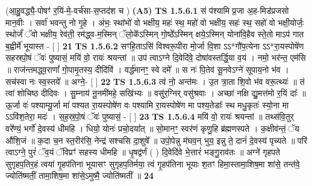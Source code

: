 \documentclass[17pt]{extarticle}
\begin{document}
                  \newline
                      (आ॒हु॒वद्ध्यै॒-पोषꣳ॑ र॒यिं-मे॒-वर्च॑सा-स॒प्तद॑श च )  \textbf{(A5)} \newline \newline
                                        \textbf{ TS 1.5.6.1} \newline
                  सं प॑श्यामि प्र॒जा अ॒ह-मिड॑प्रजसो मान॒वीः । सर्वा॑ भवन्तु नो गृ॒हे । अंभः॒ स्थांभो॑ वो भक्षीय॒ महः॑ स्थ॒ महो॑ वो भक्षीय॒ सहः॑ स्थ॒ सहो॑ वो भक्षी॒योर्जः॒ स्थोर्जं॑ ॅवो भक्षीय॒ रेव॑ती॒ रम॑द्ध्व-म॒स्मिन् ॅलो॒के᳚ऽस्मिन् गो॒ष्ठे᳚ऽस्मिन् क्षये॒ऽस्मिन् योना॑वि॒हैव स्ते॒तो माऽप॑ गात ब॒ह्वीर्मे॑ भूयास्त - [ ] \textbf{  21} \newline
                  \newline
                                \textbf{ TS 1.5.6.2} \newline
                  सꣳहि॒ताऽसि॑ विश्वरू॒पीरा मो॒र्जा वि॒शा ऽऽ*गौ॑प॒त्येना ऽऽ*रा॒यस्पोषे॑ण सहस्रपो॒षं ॅवः॑ पुष्यासं॒ मयि॑ वो॒ रायः॑ श्रयन्तां ॥ उप॑ त्वाऽग्ने दि॒वेदि॑वे॒ दोषा॑वस्तर्द्धि॒या व॒यं । नमो॒ भर॑न्त॒ एम॑सि ॥ राज॑न्तमद्ध्व॒राणां᳚ गो॒पामृ॒तस्य॒ दीदि॑विं । वर्द्ध॑मानꣳ॒॒ स्वे दमे᳚ ॥ स नः॑ पि॒तेव॑ सू॒नवेऽग्ने॑ सूपाय॒नो भ॑व । सच॑स्वा नः स्व॒स्तये᳚ ॥ अग्ने॒- [ ] \textbf{  22} \newline
                  \newline
                                \textbf{ TS 1.5.6.3} \newline
                  त्वं नो॒ अन्त॑मः । उ॒त त्रा॒ता शि॒वो भ॑व वरू॒त्थ्यः॑ ॥ तं त्वा॑ शोचिष्ठ दीदिवः । सु॒म्नाय॑ नू॒नमी॑महे॒ सखि॑भ्यः ॥ वसु॑र॒ग्निर् वसु॑श्रवाः । अच्छा॑ नक्षि द्यु॒मत्त॑मो र॒यिं दाः᳚ ॥ ऊ॒र्जा वः॑ पश्याम्यू॒र्जा मा॑ पश्यत रा॒यस्पोषे॑ण वः पश्यामि रा॒यस्पोषे॑ण मा पश्य॒तेडाः᳚ स्थ मधु॒कृतः॑ स्यो॒ना मा ऽऽवि॑श॒तेरा॒ मदः॑ । स॒ह॒स्र॒पो॒षं ॅवः॑ पुष्यासं॒ - [ ] \textbf{  23} \newline
                  \newline
                                \textbf{ TS 1.5.6.4} \newline
                  मयि॑ वो॒ रायः॑ श्रयन्तां ॥ तथ्स॑वि॒तुर् वरे᳚ण्यं॒ भर्गो॑ दे॒वस्य॑ धीमहि । धियो॒ योनः॑ प्रचो॒दया᳚त् ॥ सो॒मानꣳ॒॒ स्वर॑णं कृणु॒हि ब्र॑ह्मणस्पते । क॒क्षीव॑न्तं॒ ॅय औ॑शि॒जं ॥ क॒दा च॒न स्त॒रीर॑सि॒ नेन्द्र॑ सश्चसि दा॒शुषे᳚ ॥ उपो॒पेन्नु म॑घव॒न् भुय॒ इन्नु ते॒ दानं॑ दे॒वस्य॑ पृच्यते ॥ परि॑ त्वाऽग्ने॒ पुरं॑ ॅव॒यं ॅविप्रꣳ॑ सहस्य धीमहि ॥ धृ॒षद्व॑र्णं ( ) दि॒वेदि॑वे भे॒त्तारं॑ भङ्गु॒राव॑तः ॥ अग्ने॑ गृहपते सुगृहप॒तिर॒हं त्वया॑ गृ॒हप॑तिना भूयासꣳ सुगृहप॒तिर्मया॒ त्वं गृ॒हप॑तिना भूयाः श॒तꣳ हिमा॒स्तामा॒शिष॒मा शा॑से॒ तन्त॑वे॒ ज्योति॑ष्मतीं॒ तामा॒शिष॒मा शा॑से॒ऽमुष्मै॒ ज्योति॑ष्मतीं ॥ \textbf{  24} \newline
\end{document}

